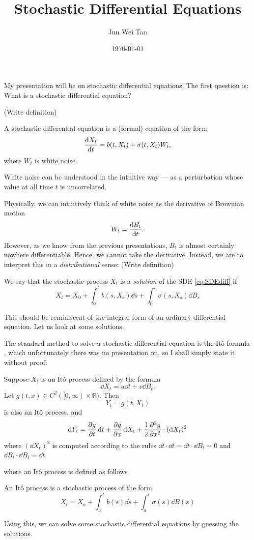 \documentclass[prb,12pt]{revtex4-2}
\theoremstyle{definition}
\theoremstyle{definition}
\theoremstyle{definition}
\newcommand{\R}{\mathbb{R}}
\begin{document}
	\title{Stochastic Differential Equations}
	\author{Jun Wei Tan}
	\date{\today}
	\maketitle
	
	{\color{red} My presentation will be on stochastic differential equations. The first question is: What is a stochastic differential equation?
	
	(Write definition)}
	\begin{Definition}
		A stochastic differential equation is a (formal) equation of the form
		\begin{equation}\label{eq:SDEdiff}
			\dv{X_t}{t}=b(t, X_t)+\sigma(t, X_t)W_t,
		\end{equation}
		where $W_t$ is white noise. 
	\end{Definition}
	{\color{red}White noise can be understood in the intuitive way --- as a perturbation whose value at all time $t$ is uncorrelated.
	
	Physically, we can intuitively think of white noise as the derivative of Brownian motion
	\[W_t = \dv{B_t}{t}.\]
	However, as we know from the previous presentations, $B_t$ is almost certainly nowhere differentiable. Hence, we cannot take the derivative. Instead, we are to interpret this in a \emph{distributional} sense: (Write definition)}
	\begin{Definition}
		We say that the stochastic process $X_t$ is a \emph{solution} of the SDE \eqref{eq:SDEdiff} if
		\[X_t = X_0+\int_0^t b(s, X_s)\dd{s}+ \int_0^t \sigma(s, X_s)\dd{B_s}\]
	\end{Definition}
	{\color{red} This should be reminiscent of the integral form of an ordinary differential equation. Let us look at some solutions.}
	
	The standard method to solve a stochastic differential equation is the Itô formula {\color{red}, which unfortunately there was no presentation on, so I shall simply state it without proof:}
	\begin{Theorem}
		Suppose $X_t$ is an Itô process defined by the formula
		\[\dd{X_t}=u\dd{t}+v\dd{B_t}.\]
		Let $g(t,x)\in C^2([0,\infty)\times \R)$. Then
		\[Y_t=g(t, X_t)\]
		is also an Itô process, and
		\[\dd{Y_t}=\pdv{g}{t}(t, X_t)\dd{t}+\pdv{g}{x}(t, X_t)\dd{X_t}+\frac 12 \pdv[2]{g}{x}(t, X_t)\cdot (\dd{X_t})^2\]
		where $(\dd{X_t})^2$ is computed according to the rules $\dd{t}\cdot \dd{t} = \dd{t}\cdot \dd{B_t}=0$ and $\dd{B_t}\cdot \dd{B_t}=\dd{t}$.
	\end{Theorem}
	where an Itô process is defined as follows
	\begin{Definition}
		An Itô process is a stochastic process of the form
		\[X_t = X_a +\int_a^t b(s)\dd{s} + \int_a^t \sigma(s)\dd{B(s)}\]
	\end{Definition}
	{\color{red} Using this, we can solve some stochastic differential equations by guessing the solutions.}
	
\end{document}
